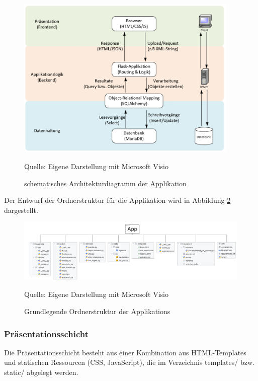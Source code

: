 \begin{figure}[H]
    \centering
    \includegraphics[width=0.95\textwidth]{Grafiken/Architekturdiagramm}
    \caption{schematisches Architekturdiagramm der Applikation}
    \label{fig:arch_minimal}
    {Quelle: Eigene Darstellung mit Microsoft Visio}
\end{figure}

Der Entwurf der Ordnerstruktur für die Applikation wird in Abbildung \ref{fig: Grundlegende Ordnerstruktur der Applikations} dargestellt.

\begin{figure}[H]
    \centering
    \includegraphics[width=1\textwidth]{Grafiken/Min Ordnerstruktur Projekt}
    \caption{Grundlegende Ordnerstruktur der Applikations}
    \label{fig: Grundlegende Ordnerstruktur der Applikations}
    {Quelle: Eigene Darstellung mit Microsoft Visio}
\end{figure}

\subsubsection{Präsentationsschicht}


Die Präsentationsschicht besteht aus einer Kombination aus HTML-Templates und statischen Ressourcen (CSS, JavaScript),
die im Verzeichnis templates/ bzw. static/ abgelegt werden.



